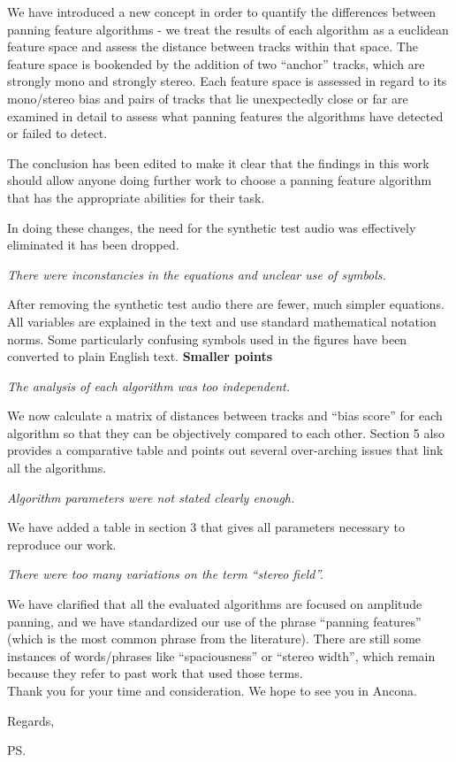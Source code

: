 \documentclass{letter}
\begin{document}
\begin{letter}{}
We have introduced a new concept in order to quantify the differences between panning feature algorithms - we treat the results of each algorithm as a euclidean feature space and assess the distance between tracks within that space. The feature space is bookended by the addition of two \enquote{anchor} tracks, which are strongly mono and strongly stereo. Each feature space is assessed in regard to its mono/stereo bias and pairs of tracks that lie unexpectedly close or far are examined in detail to assess what panning features the algorithms have detected or failed to detect.

The conclusion has been edited to make it clear that the findings in this work should allow anyone doing further work to choose a panning feature algorithm that has the appropriate abilities for their task.

In doing these changes, the need for the synthetic test audio was effectively eliminated it has been dropped.
\bigskip
\filbreak
\begin{displayquote}
    \it
    There were inconstancies in the equations and unclear use of symbols.
\end{displayquote}

After removing the synthetic test audio there are fewer, much simpler equations. All variables are explained in the text and use standard mathematical notation norms. Some particularly confusing symbols used in the figures have been converted to plain English text.
\bigskip
\filbreak
{\bf Smaller points}

\begin{displayquote}
    \it
    The analysis of each algorithm was too independent.
\end{displayquote}

We now calculate a matrix of distances between tracks and \enquote{bias score} for each algorithm so that they can be objectively compared to each other. Section 5 also provides a comparative table and points out several over-arching issues that link all the algorithms.
\bigskip
\filbreak
\begin{displayquote}
    \it
    Algorithm parameters were not stated clearly enough.
\end{displayquote}

We have added a table in section 3 that gives all parameters necessary to reproduce our work.
\bigskip
\filbreak
\begin{displayquote}
    \it
    There were too many variations on the term \enquote{stereo field}.
\end{displayquote}
We have clarified that all the evaluated algorithms are focused on amplitude panning, and we have standardized our use of the phrase \enquote{panning features} (which is the most common phrase from the literature). There are still some instances of words/phrases like \enquote{spaciousness} or \enquote{stereo width}, which remain because they refer to past work that used those terms.
\bigskip\\

Thank you for your time and consideration. We hope to see you in Ancona.
\bigskip\\

\closing{Regards,}

\ps

\end{letter}
\end{document}
